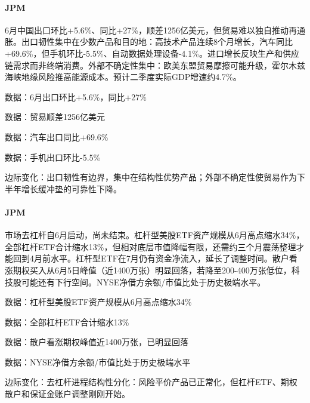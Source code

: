 \documentclass[11pt]{ctexart}
\begin{document}
\paragraph{JPM} 6月中国出口环比+5.6\%、同比+27\%，顺差1256亿美元，但贸易难以独自推动再通胀。出口韧性集中在少数产品和目的地：高技术产品连续8个月增长，汽车同比+69.6\%，但手机环比-5.5\%、自动数据处理设备-4.1\%。进口增长反映生产和供应链需求而非终端消费。外部不确定性集中：欧美东盟贸易摩擦可能升级，霍尔木兹海峡地缘风险推高能源成本。预计二季度实际GDP增速约4.7\%。
{\small\color{refgray}数据：6月出口环比+5.6\%，同比+27\%\par}
{\small\color{refgray}数据：贸易顺差1256亿美元\par}
{\small\color{refgray}数据：汽车出口同比+69.6\%\par}
{\small\color{refgray}数据：手机出口环比-5.5\%\par}
{\small\color{refgray}边际变化：出口韧性有边界，集中在结构性优势产品；外部不确定性使贸易作为下半年增长缓冲垫的可靠性下降。\par}
\paragraph{JPM} 市场去杠杆自6月启动，尚未结束。杠杆型美股ETF资产规模从6月高点缩水34\%，全部杠杆ETF合计缩水13\%，但相对底层市值降幅有限，还需约三个月震荡整理才能回到4月前水平。杠杆型ETF在7月仍有资金净流入，延长了调整时间。散户看涨期权买入从6月5日峰值（近1400万张）明显回落，若降至200-400万张低位，科技股可能还有下行空间。NYSE净借方余额/市值比处于历史极端水平。
{\small\color{refgray}数据：杠杆型美股ETF资产规模从6月高点缩水34\%\par}
{\small\color{refgray}数据：全部杠杆ETF合计缩水13\%\par}
{\small\color{refgray}数据：散户看涨期权峰值近1400万张，已明显回落\par}
{\small\color{refgray}数据：NYSE净借方余额/市值比处于历史极端水平\par}
{\small\color{refgray}边际变化：去杠杆进程结构性分化：风险平价产品已正常化，但杠杆ETF、期权散户和保证金账户调整刚刚开始。\par}
\end{document}
